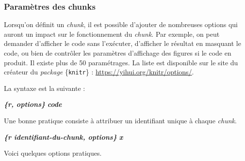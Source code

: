 \documentclass[
  11pt,
]{book}
\newenvironment{Shaded}{\begin{snugshade}}{\end{snugshade}}
\newcommand{\InformationTok}[1]{\textcolor[rgb]{0.56,0.35,0.01}{\textbf{\textit{#1}}}}
\numberwithin{equation}{section}
\numberwithin{countremarque}{section}
\begin{document}
\hypertarget{paramuxe8tres-des-chunks}{%
\subsubsection{Paramètres des chunks}\label{paramuxe8tres-des-chunks}}

Lorsqu'on définit un \emph{chunk}, il est possible d'ajouter de nombreuses options qui auront un impact sur le fonctionnement du \emph{chunk}. Par exemple, on peut demander d'afficher le code sans l'exécuter, d'afficher le résultat en masquant le code, ou bien de contrôler les paramètres d'affichage des figures si le code en produit. Il existe plus de 50 paramétrages. La liste est disponible sur le site du créateur du \emph{package} \{\texttt{knitr}\} : \url{https://yihui.org/knitr/options/}.

La syntaxe est la suivante :

\begin{Shaded}
\begin{Highlighting}[]
\InformationTok{\textasciigrave{}\textasciigrave{}\textasciigrave{}\{r, options\}}
\InformationTok{code}
\InformationTok{\textasciigrave{}\textasciigrave{}\textasciigrave{}}
\end{Highlighting}
\end{Shaded}

Une bonne pratique consiste à attribuer un identifiant unique à chaque \emph{chunk}.

\begin{Shaded}
\begin{Highlighting}[]
\InformationTok{\textasciigrave{}\textasciigrave{}\textasciigrave{}\{r identifiant{-}du{-}chunk, options\}}
\InformationTok{x}
\InformationTok{\textasciigrave{}\textasciigrave{}\textasciigrave{}}
\end{Highlighting}
\end{Shaded}

Voici quelques options pratiques.
\end{document}
